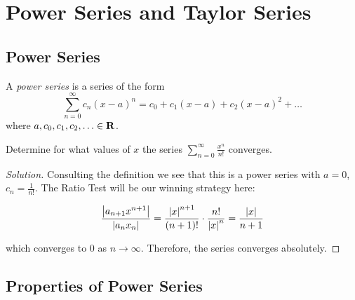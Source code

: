 \documentclass{article}
\begin{document}
    \section{Power Series and Taylor Series}
    \subsection{Power Series}
    \begin{defi}
      A \emph{power series} is a series of the form 
      \[
        \sum_{n=0}^{\infty}c_n(x-a)^n = c_0 + c_1(x-a) + c_2(x-a)^2 + \ldots
      \]
      where \(a, c_0, c_1, c_2, \ldots \in \mathbf{R}\).
    \end{defi}

    \begin{eg}
      \everymath{\displaystyle}
      Determine for what values of \(x\) the series \(\sum_{n=0}^{\infty}\frac{x^n}{n!}\) converges.
    \end{eg}

    \begin{proof}[Solution]
      Consulting the definition we see that this is a power series with \(a = 0\), \(c_n = \frac{1}{n!}\). The Ratio Test will be our winning strategy here:

      \begin{align*}
        \frac{\left\lvert a_{n+1}x^{n+1}\right\rvert}{\left\lvert a_nx_n\right\rvert} = \frac{\left\lvert x\right\rvert^{n+1}}{(n+1)!} \cdot \frac{n!}{\left\lvert x\right\rvert^n} = \frac{\left\lvert x\right\rvert}{n+1}
      \end{align*}

      which converges to 0 as \(n \to \infty\). Therefore, the series converges absolutely.
    \end{proof}

    \subsection{Properties of Power Series}
    \begin{prop}
      
    \end{prop}
    
\end{document}
